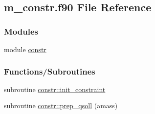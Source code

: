 \hypertarget{m__constr_8f90}{}\subsection{m\+\_\+constr.\+f90 File Reference}
\label{m__constr_8f90}
\subsubsection*{Modules}
\begin{DoxyCompactItemize}
\item 
module \hyperlink{namespaceconstr}{constr}
\end{DoxyCompactItemize}
\subsubsection*{Functions/\+Subroutines}
\begin{DoxyCompactItemize}
\item 
subroutine \hyperlink{namespaceconstr_ad575b28fb0f6b8cd818c128e07652226}{constr\+::init\+\_\+constraint}
\item 
subroutine \hyperlink{namespaceconstr_a14957f8db46b23bccfd1ae183bcc6680}{constr\+::prep\+\_\+qsoll} (amass)
\end{DoxyCompactItemize}
